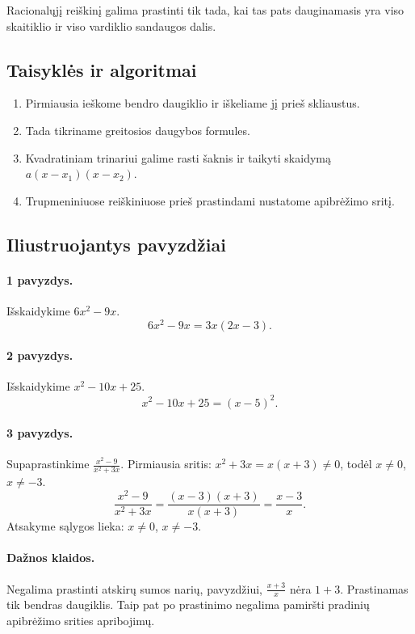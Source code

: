 \begin{savybe}
Racionalųjį reiškinį galima prastinti tik tada, kai tas pats dauginamasis yra viso skaitiklio ir viso vardiklio sandaugos dalis.
\end{savybe}

\subsection{Taisyklės ir algoritmai}

\begin{enumerate}
\item Pirmiausia ieškome bendro daugiklio ir iškeliame jį prieš skliaustus.
\item Tada tikriname greitosios daugybos formules.
\item Kvadratiniam trinariui galime rasti šaknis ir taikyti skaidymą $a(x-x_1)(x-x_2)$.
\item Trupmeniniuose reiškiniuose prieš prastindami nustatome apibrėžimo sritį.
\end{enumerate}

\subsection{Iliustruojantys pavyzdžiai}

\paragraph{1 pavyzdys.}
Išskaidykime $6x^2-9x$.
\[
6x^2-9x=3x(2x-3).
\]

\paragraph{2 pavyzdys.}
Išskaidykime $x^2-10x+25$.
\[
x^2-10x+25=(x-5)^2.
\]

\paragraph{3 pavyzdys.}
Supaprastinkime $\frac{x^2-9}{x^2+3x}$.
Pirmiausia sritis: $x^2+3x=x(x+3)\ne0$, todėl $x\ne0$, $x\ne-3$.
\[
\frac{x^2-9}{x^2+3x}=\frac{(x-3)(x+3)}{x(x+3)}=\frac{x-3}{x}.
\]
Atsakyme sąlygos lieka: $x\ne0$, $x\ne-3$.

\paragraph{Dažnos klaidos.}
Negalima prastinti atskirų sumos narių, pavyzdžiui, $\frac{x+3}{x}$ nėra $1+3$. Prastinamas tik bendras daugiklis. Taip pat po prastinimo negalima pamiršti pradinių apibrėžimo srities apribojimų.

